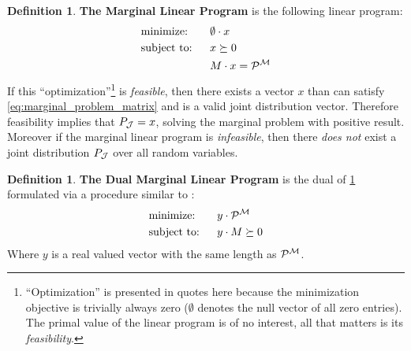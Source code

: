 \documentclass[aps, 10pt, english, twoside, pra, nofootinbib, longbibliography]{revtex4-1}
\theoremstyle{plain}
\theoremstyle{definition}
\newtheorem{definition}[theorem]{Definition}
\theoremstyle{remark}
\newcommand{\mscenario}{\mathcal{M}}
\newcommand{\jointvar}{\mathcal{J}}
\newcommand{\term}[1]{\textcolor{Mahogany}{\textbf{#1}}}
\begin{document}
    \begin{definition}
        \label{def:marginal_linear_program}
        \term{The Marginal Linear Program} is the following linear program:
        \begin{alignat*}{2}
            & \text{minimize:} \quad&& \emptyset \cdot x\\
            & \text{subject to:} && x \succeq 0 \\
            & && M \cdot x = \probvec^{\mscenario}
        \end{alignat*}
        If this ``optimization''\footnote{``Optimization'' is presented in quotes here because the minimization objective is trivially always zero ($\emptyset$ denotes the null vector of all zero entries). The primal value of the linear program is of no interest, all that matters is its \textit{feasibility}.} is \textit{feasible}, then there exists a vector $x$ than can satisfy \cref{eq:marginal_problem_matrix} and is a valid joint distribution vector. Therefore feasibility implies that $\prob[\jointvar] = x$, solving the marginal problem with positive result. Moreover if the marginal linear program is \textit{infeasible}, then there \textit{does not} exist a joint distribution $\prob[\jointvar]$ over all random variables.
    \end{definition}
    \begin{definition}
        \label{def:dual_marginal_linear_program}
        \term{The Dual Marginal Linear Program} is the dual of \cref{def:marginal_linear_program} formulated via a procedure similar to \cite{Lahaie_2008}:
        \begin{alignat*}{2}
            & \text{minimize:} \quad&& y \cdot \probvec^{\mscenario}\\
            & \text{subject to:} && y \cdot M \succeq 0
        \end{alignat*}
        Where $y$ is a real valued vector with the same length as $\probvec^{\mscenario}$.
    \end{definition}
\end{document}
